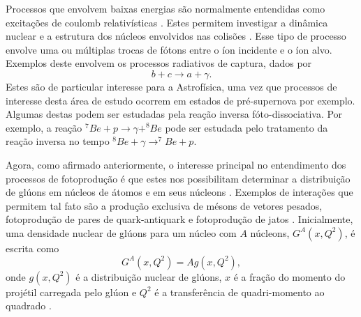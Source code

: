 \begin{table}[h]
\end{table}

Processos que envolvem baixas energias são normalmente entendidas como
excitações de coulomb relativísticas \cite{BERTULANI1988299}. Estes permitem
investigar a dinâmica nuclear e a estrutura dos núcleos envolvidos nas colisões
\cite{bertulani2005}.  Esse tipo de processo envolve uma ou múltiplas trocas
de fótons entre o íon incidente e o íon alvo. Exemplos deste envolvem os
processos radiativos de captura, dados por
\begin{equation}
	b + c \rightarrow a  + \gamma.
\end{equation}
Estes são de particular interesse para a Astrofísica, uma vez que processos de
interesse desta área de estudo ocorrem em estados de pré-supernova por exemplo.
Algumas destas podem ser estudadas pela reação inversa fóto-dissociativa.  Por
exemplo, a reação $^7 Be + p \rightarrow \gamma + ^8Be$ pode ser estudada pelo
tratamento da reação inversa no tempo $^8Be + \gamma \rightarrow ^7Be + p$.

Agora, como afirmado anteriormente, o interesse principal no entendimento dos
processos de fotoprodução é que estes nos possibilitam determinar a
distribuição de glúons em núcleos de átomos e em seus núcleons
\cite{BALTZ20081}. Exemplos de interações que permitem tal fato são a produção
exclusiva de mésons de vetores pesados, fotoprodução de pares de
quark-antiquark e fotoprodução de jatos \cite{KRAUSS1997503}. Inicialmente, uma
densidade nuclear de glúons para um núcleo com $A$ núcleons, $G^A(x,Q^2)$, é
escrita como
\begin{equation}
	G^A (x,Q^2) = A g(x,Q^2),
\end{equation}
onde $g(x,Q^2)$ é a distribuição nuclear de glúons, $x$ é a fração do momento
do projétil carregada pelo glúon e $Q^2$ é a transferência de quadri-momento ao
quadrado \cite{bertulani2005}.
